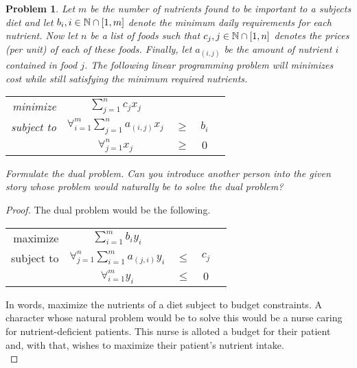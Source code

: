 \documentclass[12pt,oneside]{amsart}
\numberwithin{equation}{section}
\numberwithin{figure}{section}
\theoremstyle{plain}
\newtheorem{prob}{Problem}
\theoremstyle{definition}
\newcommand{\N}{\ensuremath \mathbb{N}}
\begin{document}
\begin{prob}
Let $m$ be the number of nutrients found to be important to a subjects diet and 
let $b_i, i \in \N \cap [1,m]$ denote the minimum daily requirements for each 
nutrient. Now let $n$ be a list of foods such that $c_j, j \in \N \cap [1,n]$ 
denotes the prices (per unit) of each of these foods. Finally, let $a_{(i,j)}$ 
be the amount of nutrient $i$ contained in food $j$. The following linear 
programming problem will minimizes cost while still satisfying the minimum 
required nutrients. \\
\begin{center}\begin{tabular}{rcccc}
  minimize &   $\sum_{j=1}^{n}c_jx_j$                         &        &       \\
  subject to & $\forall_{i=1}^{m} \sum_{j=1}^{n}a_{(i,j)}x_j$ & $\geq$ & $b_i$ \\
             & $\forall_{j=1}^{n} x_j$                        & $\geq$ & $0$   \\
\end{tabular}\end{center}
Formulate the dual problem. Can you introduce another person into the given story 
whose problem would naturally be to solve the dual problem? \\
\end{prob}
\begin{proof}
The dual problem would be the following. \\
\begin{center}\begin{tabular}{rcccc}
  maximize   & $\sum_{i=1}^{m}b_iy_i$                         &        &       \\
  subject to & $\forall_{j=1}^{n} \sum_{i=1}^{m}a_{(j,i)}y_i$ & $\leq$ & $c_j$ \\
             & $\forall_{i=1}^{m} y_i$                        & $\leq$ & $0$   \\
\end{tabular}\end{center}
In words, maximize the nutrients of a diet subject to budget constraints. A 
character whose natural problem would be to solve this would be a nurse caring 
for nutrient-deficient patients. This nurse is alloted a budget for their patient 
and, with that, wishes to maximize their patient's nutrient intake. \\
\end{proof}
\end{document}
